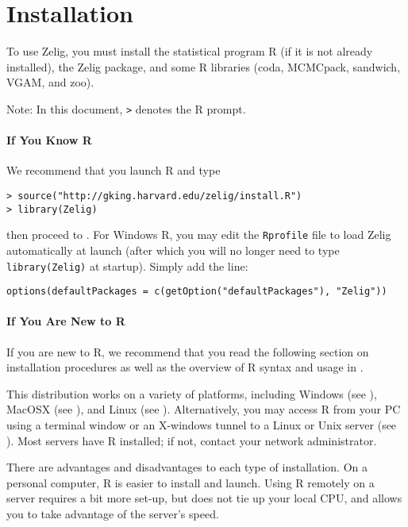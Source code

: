 \chapter{Installation}

To use Zelig, you must install the statistical program R (if it is not
already installed), the Zelig package, and some R libraries (coda,
MCMCpack, sandwich, VGAM, and zoo).  

Note: In this document, {\tt >} denotes the R prompt.  

\subsubsection{If You Know R} 

We recommend that you launch R and type 
\begin{verbatim}
> source("http://gking.harvard.edu/zelig/install.R")
> library(Zelig)
\end{verbatim}
then proceed to .  For Windows R, you may edit the 
{\tt Rprofile} file to load Zelig automatically at launch (after which you
will no longer need to type {\tt library(Zelig)} at startup).  Simply
add the line:
\begin{verbatim}
options(defaultPackages = c(getOption("defaultPackages"), "Zelig"))
\end{verbatim}

\subsubsection{If You Are New to R}

If you are new to R, we recommend that you read the following section
on installation procedures as well as the overview of R syntax and
usage in .

This distribution works on a variety of platforms, including Windows
(see ), MacOSX (see ), and Linux (see
).  Alternatively, you may access R from your PC using a
terminal window or an X-windows tunnel to a Linux or Unix server (see
).  Most servers have R installed; if not, contact your
network administrator.

There are advantages and disadvantages to each type of installation.
On a personal computer, R is easier to install and launch.  Using R
remotely on a server requires a bit more set-up, but does not tie up
your local CPU, and allows you to take advantage of the server's speed.

